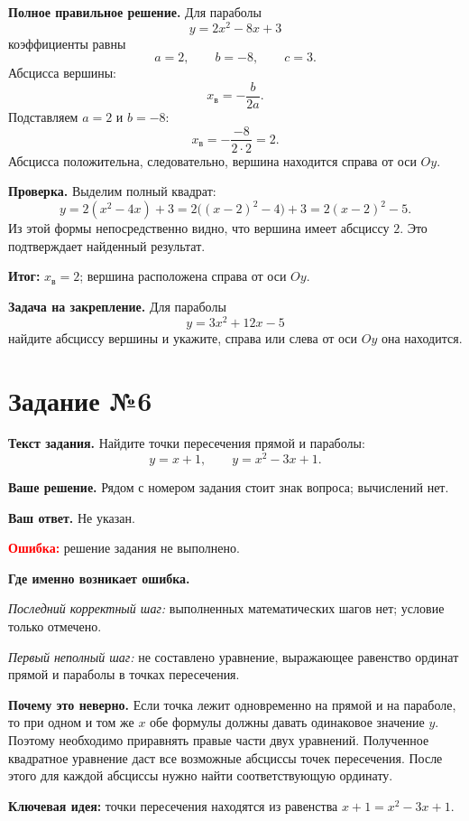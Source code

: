 \documentclass[12pt,a4paper]{article}
\begin{document}
\textbf{Полное правильное решение.}
Для параболы
\[
y=2x^2-8x+3
\]
коэффициенты равны
\[
a=2, \qquad b=-8, \qquad c=3.
\]
Абсцисса вершины:
\[
x_{\text{в}}=-\frac{b}{2a}.
\]
Подставляем $a=2$ и $b=-8$:
\[
x_{\text{в}}=-\frac{-8}{2\cdot 2}=2.
\]
Абсцисса положительна, следовательно, вершина находится справа от оси $Oy$.

\textbf{Проверка.}
Выделим полный квадрат:
\[
y=2(x^2-4x)+3
=2\bigl((x-2)^2-4\bigr)+3
=2(x-2)^2-5.
\]
Из этой формы непосредственно видно, что вершина имеет абсциссу $2$. Это подтверждает найденный результат.

\textcolor{teal!60!black}{\textbf{Итог:}} $x_{\text{в}}=2$; вершина расположена справа от оси $Oy$.

\textbf{Задача на закрепление.}
Для параболы
\[
y=3x^2+12x-5
\]
найдите абсциссу вершины и укажите, справа или слева от оси $Oy$ она находится.

\newpage
{}\label{task:6}
\section*{Задание №6}

\textbf{Текст задания.}
Найдите точки пересечения прямой и параболы:
\[
y=x+1, \qquad y=x^2-3x+1.
\]

\textbf{Ваше решение.}
Рядом с номером задания стоит знак вопроса; вычислений нет.

\textbf{Ваш ответ.}
Не указан.

\textcolor{red}{\textbf{Ошибка:}} решение задания не выполнено.

\textbf{Где именно возникает ошибка.}

\emph{Последний корректный шаг:} выполненных математических шагов нет; условие только отмечено.

\emph{Первый неполный шаг:} не составлено уравнение, выражающее равенство ординат прямой и параболы в точках пересечения.

\textbf{Почему это неверно.}
Если точка лежит одновременно на прямой и на параболе, то при одном и том же $x$ обе формулы должны давать одинаковое значение $y$. Поэтому необходимо приравнять правые части двух уравнений. Полученное квадратное уравнение даст все возможные абсциссы точек пересечения. После этого для каждой абсциссы нужно найти соответствующую ординату.

\textcolor{blue!60!black}{\textbf{Ключевая идея:}} точки пересечения находятся из равенства $x+1=x^2-3x+1$.
\end{document}
